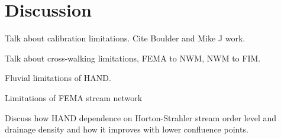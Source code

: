 \section{Discussion}
\label{sec:discussion}
%
Talk about calibration limitations. Cite Boulder and Mike J work.

Talk about cross-walking limitations, FEMA to NWM, NWM to FIM.

Fluvial limitations of HAND.

Limitations of FEMA stream network

Discuss how HAND dependence on Horton-Strahler stream order level and drainage density and how it improves with lower confluence points.

